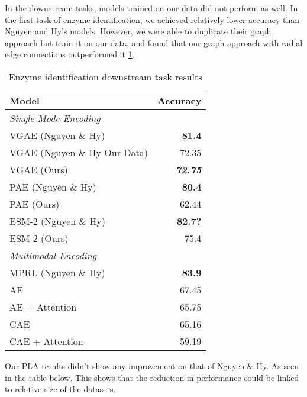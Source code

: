 \documentclass{article}
\begin{document}
In the downstream tasks, models trained on our data did not perform as well. In the first task of enzyme identification, we achieved relatively lower accuracy than Nguyen and Hy's models. However, we were able to duplicate their graph approach but train it on our data, and found that our graph approach with radial edge connections outperformed it \ref{tab:EI_results}.
\begin{table}[h]
    \centering
    \begin{tabular}{|l  r|} 
 \hline
 \bf{Model} & \bf{Accuracy} \\ 
 \hline\hline
 \textit{Single-Mode Encoding} & \\
 \hline
VGAE (Nguyen \& Hy) & \textbf{81.4} \\ 

 VGAE (Nguyen \& Hy Our Data) & 72.35 \\
VGAE (Ours) & \textbf{\textit{72.75}} \\ 
\hline
PAE (Nguyen \& Hy) & \textbf{80.4} \\
PAE (Ours) & 62.44 \\
\hline
ESM-2 (Nguyen \& Hy) & \textbf{82.7?} \\
ESM-2 (Ours) & 75.4 \\
\hline\hline
\textit{Multimodal Encoding} & \\
\hline
MPRL (Nguyen \& Hy) & \textbf{83.9} \\
AE & 67.45 \\
AE + Attention & 65.75 \\
CAE & 65.16 \\
CAE + Attention & 59.19 \\
\hline
\end{tabular}
    \caption{Enzyme identification downstream task results }
    \label{tab:EI_results}
\end{table}

Our PLA results didn't show any improvement on that of Nguyen \& Hy. As seen in the table below. This shows that the reduction in performance could be linked to relative size of the datasets.
\end{document}
